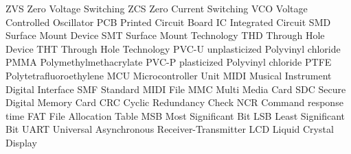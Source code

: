    {ZVS}    {Zero Voltage Switching}
   {ZCS}    {Zero Current Switching}
   {VCO}    {Voltage Controlled Oscillator}
   {PCB}    {Printed Circuit Board}
    {IC}     {Integrated Circuit}
   {SMD}    {Surface Mount Device}
   {SMT}    {Surface Mount Technology}
   {THD}    {Through Hole Device}
   {THT}    {Through Hole Technology}
  {PVC-U}  {unplasticized Polyvinyl chloride}
  {PMMA}   {Polymethylmethacrylate}
  {PVC-P}  {plasticized Polyvinyl chloride}
  {PTFE}   {Polytetrafluoroethylene}
   {MCU}    {Microcontroller Unit}
  {MIDI}   {Musical Instrument Digital Interface}
   {SMF}    {Standard MIDI File}
   {MMC}    {Multi Media Card}
   {SDC}    {Secure Digital Memory Card}
   {CRC}    {Cyclic Redundancy Check}
   {NCR}    {Command response time}
   {FAT}    {File Allocation Table}
   {MSB}    {Most Significant Bit}
   {LSB}    {Least Significant Bit}
  {UART}   {Universal Asynchronous Receiver-Transmitter}
   {LCD}    {Liquid Crystal Display}